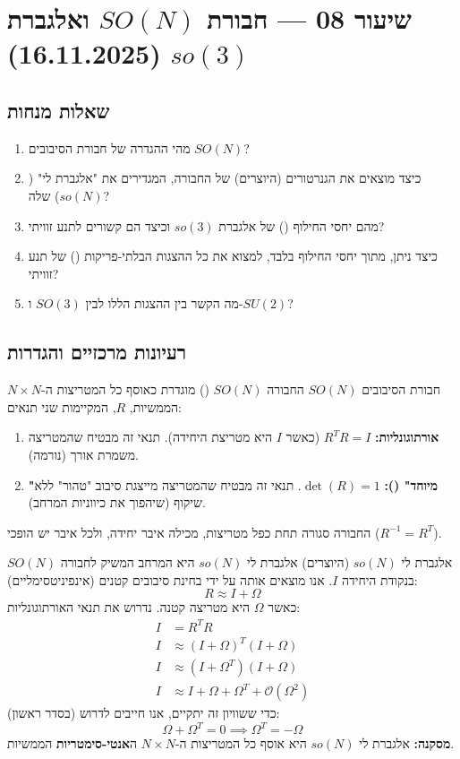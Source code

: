 \section{שיעור 08 — חבורת $SO(N)$ ואלגברת $so(3)$ (16.11.2025)}

\subsection*{שאלות מנחות}
\begin{enumerate}
    \item מהי ההגדרה של חבורת הסיבובים $SO(N)$?
    \item כיצד מוצאים את הגנרטורים (היוצרים) של החבורה, המגדירים את "אלגברת לי" ($so(N)$) שלה?
    \item מהם יחסי החילוף () של אלגברת $so(3)$ וכיצד הם קשורים לתנע זוויתי?
    \item כיצד ניתן, מתוך יחסי החילוף בלבד, למצוא את כל ההצגות הבלתי-פריקות () של תנע זוויתי?
    \item מה הקשר בין ההצגות הללו לבין $SO(3)$ ו-$SU(2)$?
\end{enumerate}

\subsection*{רעיונות מרכזיים והגדרות}

\begin{definitionbox}{חבורת הסיבובים $SO(N)$}
החבורה $SO(N)$ () מוגדרת כאוסף כל המטריצות ה-$N \times N$ הממשיות, $R$, המקיימות שני תנאים:
\begin{enumerate}
    \item \textbf{אורתוגונליות:} $R^T R = I$ (כאשר $I$ היא מטריצת היחידה). תנאי זה מבטיח שהמטריצה משמרת אורך (נורמה).
    \item \textbf{"מיוחד" ():} $\det(R) = 1$. תנאי זה מבטיח שהמטריצה מייצגת סיבוב "טהור" ללא שיקוף (שיהפוך את כיווניות המרחב).
\end{enumerate}
החבורה סגורה תחת כפל מטריצות, מכילה איבר יחידה, ולכל איבר יש הופכי ($R^{-1} = R^T$).
\end{definitionbox}

\begin{definitionbox}{אלגברת לי $so(N)$ (היוצרים)}
אלגברת לי $so(N)$ היא המרחב המשיק לחבורה $SO(N)$ בנקודת היחידה $I$.
אנו מוצאים אותה על ידי בחינת סיבובים קטנים (אינפיניטסימליים):
$$ R \approx I + \Omega $$
כאשר $\Omega$ היא מטריצה קטנה. נדרוש את תנאי האורתוגונליות:
\begin{align*}
I &= R^T R \\
I &\approx (I + \Omega)^T (I + \Omega) \\
I &\approx (I + \Omega^T) (I + \Omega) \\
I &\approx I + \Omega + \Omega^T + \mathcal{O}(\Omega^2)
\end{align*}
כדי ששוויון זה יתקיים, אנו חייבים לדרוש (בסדר ראשון):
$$ \Omega + \Omega^T = 0 \implies \Omega^T = -\Omega $$
\textbf{מסקנה:} אלגברת לי $so(N)$ היא אוסף כל המטריצות ה-$N \times N$ ה\textbf{אנטי-סימטריות} הממשיות.
\end{definitionbox}

